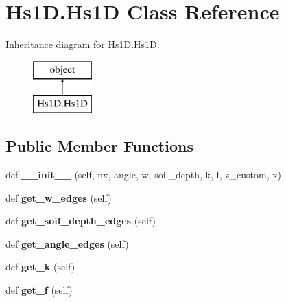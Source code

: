 \hypertarget{class_hs1_d_1_1_hs1_d}{}\section{Hs1\+D.\+Hs1D Class Reference}
\label{class_hs1_d_1_1_hs1_d}
Inheritance diagram for Hs1\+D.\+Hs1D\+:\begin{figure}[H]
\begin{center}
\leavevmode
\includegraphics[height=2.000000cm]{class_hs1_d_1_1_hs1_d}
\end{center}
\end{figure}
\subsection*{Public Member Functions}
\begin{DoxyCompactItemize}
\item 
\hypertarget{class_hs1_d_1_1_hs1_d_a941546c82bf143abe81b50e5aa776974}{}\label{class_hs1_d_1_1_hs1_d_a941546c82bf143abe81b50e5aa776974} 
def {\bfseries \+\_\+\+\_\+init\+\_\+\+\_\+} (self, nx, angle, w, soil\+\_\+depth, k, f, z\+\_\+custom, x)
\item 
\hypertarget{class_hs1_d_1_1_hs1_d_a609192fa9038f7ab060dab430637236f}{}\label{class_hs1_d_1_1_hs1_d_a609192fa9038f7ab060dab430637236f} 
def {\bfseries get\+\_\+w\+\_\+edges} (self)
\item 
\hypertarget{class_hs1_d_1_1_hs1_d_a7205363d9052b79d7634262ea5ffc6a8}{}\label{class_hs1_d_1_1_hs1_d_a7205363d9052b79d7634262ea5ffc6a8} 
def {\bfseries get\+\_\+soil\+\_\+depth\+\_\+edges} (self)
\item 
\hypertarget{class_hs1_d_1_1_hs1_d_a7690c0b1b76d9bd363fb1e02f581f4e8}{}\label{class_hs1_d_1_1_hs1_d_a7690c0b1b76d9bd363fb1e02f581f4e8} 
def {\bfseries get\+\_\+angle\+\_\+edges} (self)
\item 
\hypertarget{class_hs1_d_1_1_hs1_d_a1460c5bbb135a1b55529600e1b1f5bbd}{}\label{class_hs1_d_1_1_hs1_d_a1460c5bbb135a1b55529600e1b1f5bbd} 
def {\bfseries get\+\_\+k} (self)
\item 
\hypertarget{class_hs1_d_1_1_hs1_d_a41d0dc149f791ed7a1238f0757fe5cdd}{}\label{class_hs1_d_1_1_hs1_d_a41d0dc149f791ed7a1238f0757fe5cdd} 
def {\bfseries get\+\_\+f} (self)
\end{DoxyCompactItemize}
